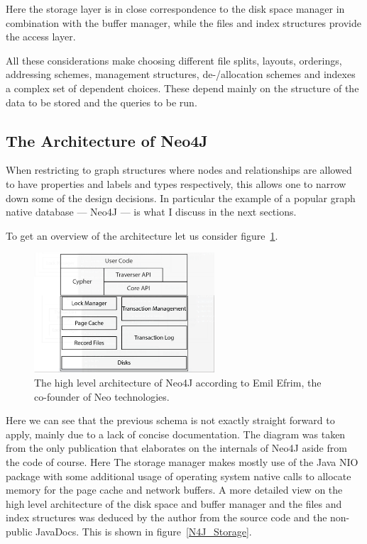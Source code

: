 \documentclass[a4paper,10pt]{article}
\begin{document}
        Here the storage layer is in close correspondence to the disk space manager in combination with the buffer manager, while the files and index structures provide the access layer.

        All these considerations make choosing different file splits, layouts, orderings, addressing schemes, management structures, de-/allocation schemes and indexes a complex set of dependent choices. 
        These depend mainly on the structure of the data to be stored and the queries to be run. 

    \subsection{The Architecture of Neo4J}
        When restricting to graph structures where nodes and relationships are allowed to have properties and labels and types respectively, this allows one to narrow down some of the design decisions. In particular the example of a popular graph native database --- Neo4J --- is what I discuss in the next sections. 

        To get an overview of the architecture let us consider figure~\ref{N4J_HLA_Emil}. 

        \begin{figure}[htp]\label{N4J_HLA_Emil}
        \begin{center}
        \includegraphics[keepaspectratio,width=0.6\textwidth]{img/00_intro/N4J_HLA_Emil.png}
        \end{center}
        \caption{The high level architecture of Neo4J according to Emil Efrim, the co-founder of Neo technologies.} %
        \end{figure}

        Here we can see that the previous schema is not exactly straight forward to apply, mainly due to a lack of concise documentation. The diagram was taken from the only publication that elaborates on the internals of Neo4J aside from the code of course. Here The storage manager makes mostly use of the Java NIO package with some additional usage of operating system native calls to allocate memory for the page cache and network buffers. 
        A more detailed view on the high level architecture of the disk space and buffer manager and the files and index structures was deduced by the author from the source code and the non-public JavaDocs. This is shown in figure~\ref{N4J_Storage}.
\end{document}
